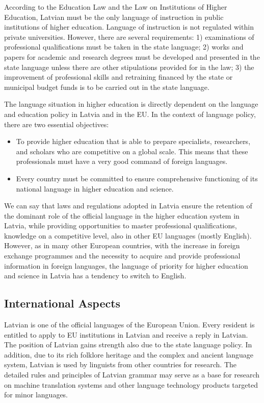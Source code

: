 \begin{multicols}{2}
According to the Education Law and the Law on Institutions of Higher Education, Latvian must be the only language of instruction in public institutions of higher education.
Language of instruction is not regulated within private universities.
However, there are several requirements: 1) examinations of professional qualifications must be taken in the state language; 2) works and papers for academic and research degrees must be developed and presented in the state language unless there are other stipulations provided for in the law; 3) the improvement of professional skills and retraining financed by the state or municipal budget funds is to be carried out in the state language.

The language situation in higher education is directly dependent on the language and education policy in Latvia and in the EU.
In the context of language policy, there are two essential objectives:

\begin{itemize}
\item  To provide higher education that is able to prepare specialists, researchers, and scholars who are competitive on a global scale.
This means that these professionals must have a very good command of foreign languages.
\item  Every country must be committed to ensure comprehensive functioning of its national language in higher education and science.
\end{itemize}

We can say that laws and regulations adopted in Latvia ensure the retention of the dominant role of the official language in the higher education system in Latvia, while providing opportunities to master professional qualifications, knowledge on a competitive level, also in other EU languages (mostly English).
However, as in many other European countries, with the increase in foreign exchange programmes and the necessity to acquire and provide professional information in foreign languages, the language of priority for higher education and science in Latvia has a tendency to switch to English.

\subsection{International Aspects}

 Latvian is one of the official languages of the European Union.
Every resident is entitled to apply to EU institutions in Latvian and receive a reply in Latvian.
The position of Latvian gains strength also due to the state language policy.
In addition, due to its rich folklore heritage and the complex and ancient language system, Latvian is used by linguists from other countries for research.
The detailed rules and principles of Latvian grammar may serve as a base for research on machine translation systems and other language technology products targeted for minor languages.


\end{multicols}
